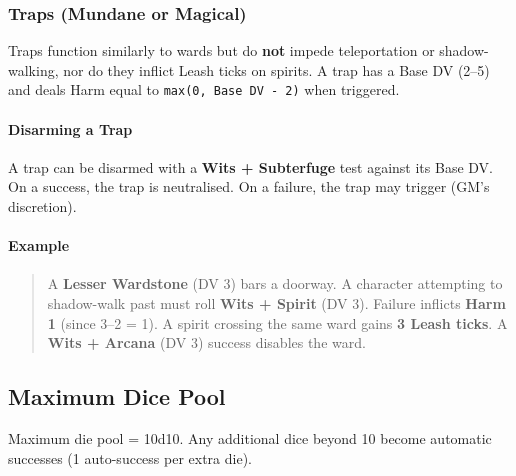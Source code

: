 \subsubsection{Traps (Mundane or Magical)}

Traps function similarly to wards but do \textbf{not} impede teleportation or shadow-walking, nor do they inflict Leash ticks on spirits. A trap has a Base DV (2--5) and deals Harm equal to \texttt{max(0, Base DV - 2)} when triggered.

\paragraph{Disarming a Trap}
A trap can be disarmed with a \textbf{Wits + Subterfuge} test against its Base DV. On a success, the trap is neutralised. On a failure, the trap may trigger (GM's discretion).

\paragraph{Example}
\begin{quote}
    A \textbf{Lesser Wardstone} (DV 3) bars a doorway. A character attempting to shadow-walk past must roll \textbf{Wits + Spirit} (DV 3). Failure inflicts \textbf{Harm 1} (since 3--2 = 1). A spirit crossing the same ward gains \textbf{3 Leash ticks}. A \textbf{Wits + Arcana} (DV 3) success disables the ward.
\end{quote}

\subsection{Maximum Dice Pool}

Maximum die pool = 10d10. Any additional dice beyond 10 become automatic successes (1 auto-success per extra die).